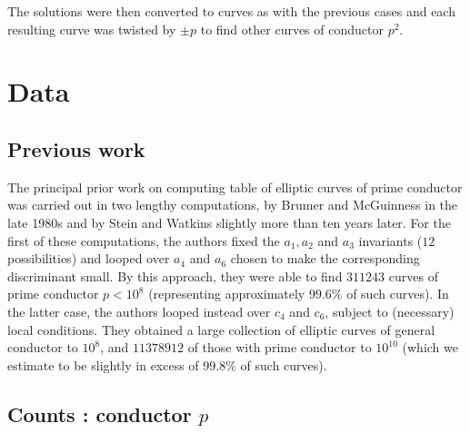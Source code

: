 The solutions were then converted to curves as with the previous cases and each resulting 
curve was twisted by $\pm p$ to find other curves of conductor $p^2$. 

\section{Data} \label{data}

\subsection{Previous work}
The principal prior work on computing table of elliptic curves of prime conductor was carried out in two lengthy computations, by Brumer and McGuinness \cite{BrMc} in the late 1980s and by Stein and Watkins \cite{StWa} slightly more than ten years later. 
For the first of these computations, the authors fixed the $a_1, a_2$ and $a_3$ invariants ($12$ possibilities) and looped over $a_4$ and $a_6$ chosen to make the corresponding discriminant small.
By this approach, they were able to find $311243$ curves of prime conductor $p < 10^8$ (representing approximately $99.6 \%$ of such curves). In the latter case, the authors looped instead over $c_4$ and $c_6$, subject to (necessary) local conditions. They obtained a large collection of elliptic curves of general conductor to $10^8$, and $11378912$ of those with prime conductor to $10^{10}$ (which we estimate to be slightly in excess of $99.8 \%$ of such curves).

\subsection{Counts : conductor $p$}

